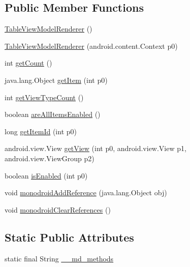 \subsection*{Public Member Functions}
\begin{CompactItemize}
\item 
\hyperlink{classmd5b60ffeb829f638581ab2bb9b1a7f4f3f_1_1_table_view_model_renderer_673ded470627b54f3b42e98bd4891e66}{TableViewModelRenderer} ()
\item 
\hyperlink{classmd5b60ffeb829f638581ab2bb9b1a7f4f3f_1_1_table_view_model_renderer_ad4e5ad3ec274ab13c8625a4e0a16e8f}{TableViewModelRenderer} (android.content.Context p0)
\item 
int \hyperlink{classmd5b60ffeb829f638581ab2bb9b1a7f4f3f_1_1_table_view_model_renderer_3ee9ec4f5e214d15ca53d52792300f53}{getCount} ()
\item 
java.lang.Object \hyperlink{classmd5b60ffeb829f638581ab2bb9b1a7f4f3f_1_1_table_view_model_renderer_29fccc826a353ce09af883f666114b60}{getItem} (int p0)
\item 
int \hyperlink{classmd5b60ffeb829f638581ab2bb9b1a7f4f3f_1_1_table_view_model_renderer_bdc0339817da42f6cb84ae51e23dfdcc}{getViewTypeCount} ()
\item 
boolean \hyperlink{classmd5b60ffeb829f638581ab2bb9b1a7f4f3f_1_1_table_view_model_renderer_cd02c865f8a377a11fa054fa8269b8bc}{areAllItemsEnabled} ()
\item 
long \hyperlink{classmd5b60ffeb829f638581ab2bb9b1a7f4f3f_1_1_table_view_model_renderer_b9aaff4a338f4d59482b230ef3a05bcb}{getItemId} (int p0)
\item 
android.view.View \hyperlink{classmd5b60ffeb829f638581ab2bb9b1a7f4f3f_1_1_table_view_model_renderer_57aa1ff548af7c33edb21978ce2bc22c}{getView} (int p0, android.view.View p1, android.view.ViewGroup p2)
\item 
boolean \hyperlink{classmd5b60ffeb829f638581ab2bb9b1a7f4f3f_1_1_table_view_model_renderer_ef3b0c0ebeeaef7cf5f3071788276cbc}{isEnabled} (int p0)
\item 
void \hyperlink{classmd5b60ffeb829f638581ab2bb9b1a7f4f3f_1_1_table_view_model_renderer_f694d5eaa766065b71fdc6e4204b904d}{monodroidAddReference} (java.lang.Object obj)
\item 
void \hyperlink{classmd5b60ffeb829f638581ab2bb9b1a7f4f3f_1_1_table_view_model_renderer_92f10ed6c4706c14be7fcc1b40449cb2}{monodroidClearReferences} ()
\end{CompactItemize}
\subsection*{Static Public Attributes}
\begin{CompactItemize}
\item 
static final String \hyperlink{classmd5b60ffeb829f638581ab2bb9b1a7f4f3f_1_1_table_view_model_renderer_21b72c97f46fee0f30a471fc36c20e2c}{\_\-\_\-md\_\-methods}
\end{CompactItemize}
